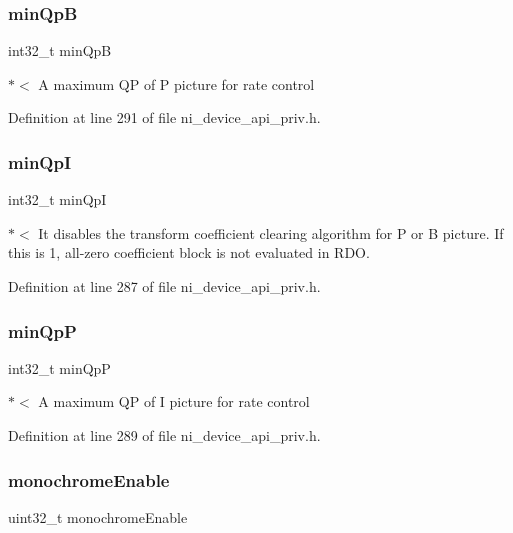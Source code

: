 \subsubsection{\texorpdfstring{minQpB}{minQpB}}
{\footnotesize\ttfamily int32\+\_\+t min\+QpB}

$\ast$$<$ A maximum QP of P picture for rate control 

Definition at line 291 of file ni\+\_\+device\+\_\+api\+\_\+priv.\+h.

\mbox{\label{struct__ni__t408__config__t_ac4954d3d19a69e29f4ce3a0aca301f84}} 
\subsubsection{\texorpdfstring{minQpI}{minQpI}}
{\footnotesize\ttfamily int32\+\_\+t min\+QpI}

$\ast$$<$ It disables the transform coefficient clearing algorithm for P or B picture. If this is 1, all-\/zero coefficient block is not evaluated in R\+DO. 

Definition at line 287 of file ni\+\_\+device\+\_\+api\+\_\+priv.\+h.

\mbox{\label{struct__ni__t408__config__t_ab2c629d90fa0cd4417eb55353c422b8a}} 
\subsubsection{\texorpdfstring{minQpP}{minQpP}}
{\footnotesize\ttfamily int32\+\_\+t min\+QpP}

$\ast$$<$ A maximum QP of I picture for rate control 

Definition at line 289 of file ni\+\_\+device\+\_\+api\+\_\+priv.\+h.

\mbox{\label{struct__ni__t408__config__t_a57d235a68d29d3c69f73f59a2337da8f}} 
\subsubsection{\texorpdfstring{monochromeEnable}{monochromeEnable}}
{\footnotesize\ttfamily uint32\+\_\+t monochrome\+Enable}

